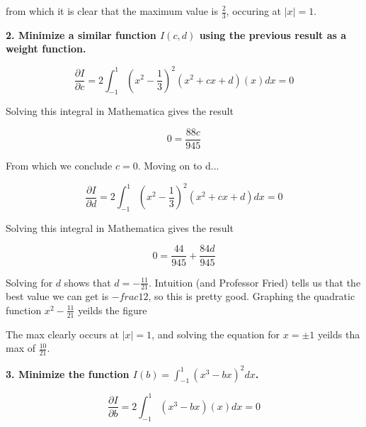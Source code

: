 \documentclass[a4paper,12pt]{article}
\begin{document}
from which it is clear that the maximum value is $\frac{2}{3}$, occuring at $|x|=1$.

\vspace{2mm}

{\bf 2. Minimize a similar function $I(c,d)$ using the previous result as a weight function. }

\begin{equation}
\frac{\partial I}{\partial c} = 2 \int_{-1}^1(x^2-\frac{1}{3})^2(x^2+cx+d)(x) dx = 0
\end{equation}

Solving this integral in Mathematica gives the result

\begin{equation}
0 = \frac{88c}{945}
\end{equation}

From which we conclude $c=0$. Moving on to d...

\begin{equation}
\frac{\partial I}{\partial d} = 2 \int_{-1}^1(x^2-\frac{1}{3})^2(x^2+cx+d) dx = 0
\end{equation}

Solving this integral in Mathematica gives the result

\begin{equation}
0 = \frac{44}{945}+\frac{84d}{945}
\end{equation}

Solving for $d$ shows that $d=-\frac{11}{21}$. Intuition (and Professor Fried) tells us that the best value we can get is $-frac{1}{2}$, so this is pretty good. Graphing the quadratic function $x^2-\frac{11}{21}$ yeilds the figure

\begin{center}
  \begin{figure}[h!]
  \end{figure}
\end{center}

The max clearly occurs at $|x|=1$, and solving the equation for $x=\pm 1$ yeilds tha max of $\frac{10}{21}$.

\vspace{2mm}

{\bf 3. Minimize the function $I(b)=\int_{-1}^1(x^3-bx)^2 dx$.} 

\begin{equation}
\frac{\partial I}{\partial b} = 2 \int_{-1}^1(x^3-bx)(x) dx = 0
\end{equation}
\end{document}
